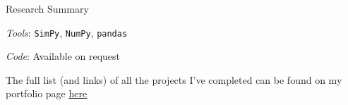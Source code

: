 \begin{rubric}{Research Summary}
    \vspace{0.25cm}
    \par \emph{Tools}: \verb|SimPy|, \verb|NumPy|, \verb|pandas|
    \par \emph{Code}: Available on request

    \vspace{1cm}
    \begin{center}
        The full list (and links) of all the projects I've completed can be found on my portfolio page \href{https://srabon-s-portfolio.vercel.app/portfolio/projects}{\underline{here}}
    \end{center}
\end{rubric}

